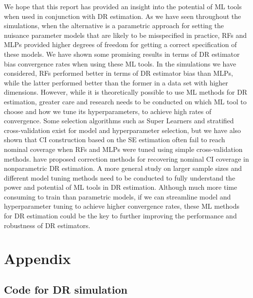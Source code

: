 \documentclass[12pt,twoside]{article}
\begin{document}
We hope that this report has provided an insight into the potential of ML tools when used in conjunction with DR estimation. As we have seen throughout the simulations, when the alternative is a parametric approach for setting the nuisance parameter models that are likely to be misspecified in practice, RFs and MLPs provided higher degrees of freedom for getting a correct specification of these models. We have shown some promising results in terms of DR estimator bias convergence rates when using these ML tools. In the simulations we have considered, RFs performed better in terms of DR estimator bias than MLPs, while the latter performed better than the former in a data set with higher dimensions. However, while it is theoretically possible to use ML methods for DR estimation, greater care and research needs to be conducted on which ML tool to choose and how we tune its hyperparameters, to achieve high rates of convergence. Some selection algorithms such as Super Learners and stratified cross-validation exist for model and hyperparameter selection, but we have also shown that CI construction based on the \cite{lunceford_davidian} SE estimation often fail to reach nominal coverage when RFs and MLPs were tuned using simple cross-validation methods. \cite{benkeser2017} have proposed correction methods for recovering nominal CI coverage in nonparametric DR estimation. A more general study on larger sample sizes and different model tuning methods need to be conducted to fully understand the power and potential of ML tools in DR estimation. Although much more time consuming to train than parametric models, if we can streamline model and hyperparameter tuning to achieve higher convergence rates, these ML methods for DR estimation could be the key to further improving the performance and robustness of DR estimators.


\clearpage



\clearpage
\section*{Appendix}

\subsection*{Code for DR simulation}


\end{document}
